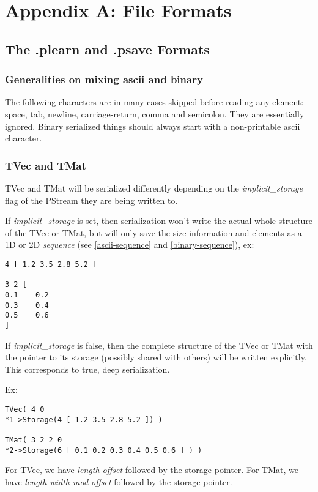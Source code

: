 \documentclass[11pt]{book}
\begin{document}
\chapter{Appendix A: File Formats}

\section{The .plearn and .psave Formats}

\subsection{Generalities on mixing ascii and binary}

The following characters are in many cases skipped before reading any
element: space, tab, newline, carriage-return, comma and semicolon. They
are essentially ignored. Binary serialized things should always start with
a non-printable ascii character.


\subsection{TVec and TMat}

TVec and TMat will be serialized differently depending on the {\em
implicit\_storage} flag of the PStream they are being written to.

If {\em implicit\_storage} is set, then serialization won't write the actual
whole structure of the TVec or TMat, but will only save the size information
and elements as a 1D or 2D {\em sequence} (see \ref{ascii-sequence} and
\ref{binary-sequence}), ex:

\begin{verbatim}
4 [ 1.2 3.5 2.8 5.2 ]

3 2 [
0.1    0.2
0.3    0.4
0.5    0.6
]
\end{verbatim}

If {\em implicit\_storage} is false, then the complete structure of the
TVec or TMat with the pointer to its storage (possibly shared with others)
will be written explicitly. This corresponds to true, deep serialization.

Ex:

\begin{verbatim}
TVec( 4 0 
*1->Storage(4 [ 1.2 3.5 2.8 5.2 ]) )

TMat( 3 2 2 0 
*2->Storage(6 [ 0.1 0.2 0.3 0.4 0.5 0.6 ] ) )
\end{verbatim}

For TVec, we have {\em length offset} followed by the storage pointer.
For TMat, we have {\em length width mod offset} followed by the storage pointer.
\end{document}
